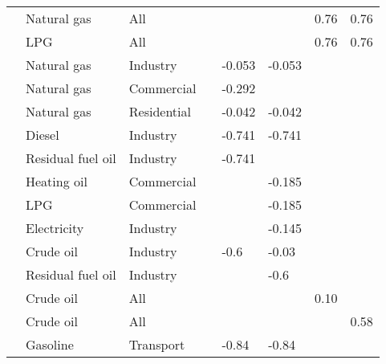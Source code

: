 \begin{ThreePartTable}
\begin{longtable}{ >{\raggedright}p{9em} l l l l l l l }
    \cite{ponce_elasticities_2014}                       & Natural gas   & All         &      &         &         & 0.76    & 0.76   \\
                                                          & LPG           & All         &      &         &         & 0.76\tnote{a} & 0.76\tnote{a} \\ 
    \cite{labandeira_meta-analysis_2017}                 & Natural gas   & Industry    &      & -0.053  & -0.053  &         &        \\
                                                          & Natural gas   & Commercial  &      & -0.292  &         &         &        \\
                                                          & Natural gas   & Residential &      & -0.042  & -0.042  &         &        \\
                                                          & Diesel        & Industry    &      & -0.741  & -0.741  &         &        \\
                                                          & Residual fuel oil& Industry &      & -0.741\tnote{b}  & &         &        \\
                                                          & Heating oil   & Commercial  &      &         & -0.185  &         &        \\
                                                          & LPG           & Commercial  &      &         & -0.185\tnote{c}        &         &        \\
                                                          & Electricity   & Industry    &      &         & -0.145  &         &        \\ 
    \cite{anton_taxing_2020}                             & Crude oil     & Industry    &      & -0.6    & -0.03   &         &        \\
                                                              & Residual fuel oil& Industry &      &         & -0.6\tnote{d}   &         &        \\
    \cite{smith_world_2009}                              & Crude oil     & All         &      &         &         & 0.10    &        \\ 
    \cite{gately_opecs_2004}                             & Crude oil     & All         &      &         &         &         & 0.58   \\ 
    \cite{brons_meta-analysis_2008}                      & Gasoline      & Transport   &      & -0.84   & -0.84   &         &        \\ 

\end{longtable}
\end{ThreePartTable}
